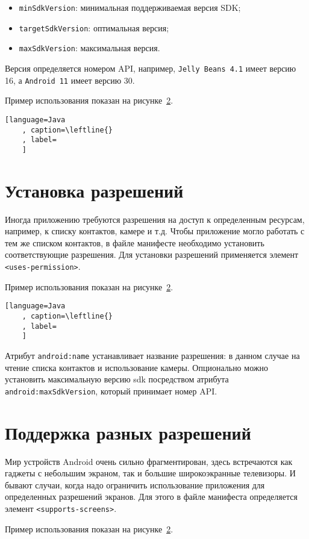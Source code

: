 \begin{itemize}
	\item \texttt{minSdkVersion}: минимальная поддерживаемая версия SDK;
	\item \texttt{targetSdkVersion}: оптимальная версия;
	\item \texttt{maxSdkVersion}: максимальная версия.
\end{itemize}

Версия определяется номером API, например, \texttt{Jelly Beans 4.1}
имеет версию 16, а \texttt{Android 11} имеет версию 30.\par
Пример использования показан на рисунке~\ref{}.

\begin{lstlisting}[language=Java
	, caption=\leftline{}
	, label=
	]
\end{lstlisting}

\section{Установка разрешений}
Иногда приложению требуются разрешения на доступ к определенным
ресурсам, например, к списку контактов, камере и т.д. Чтобы приложение
могло работать с тем же списком контактов, в файле манифесте необходимо
установить соответствующие разрешения. Для установки разрешений
применяется элемент \texttt{<uses-permission>}.\par
Пример использования показан на рисунке~\ref{}.

\begin{lstlisting}[language=Java
	, caption=\leftline{}
	, label=
	]
\end{lstlisting}

Атрибут \texttt{android:name} устанавливает название разрешения: в данном
случае на чтение списка контактов и использование камеры. Опционально можно
установить максимальную версию sdk посредством атрибута
\texttt{android:maxSdkVersion}, который принимает номер API.

\section{Поддержка разных разрешений}
Мир устройств Android очень сильно фрагментирован, здесь встречаются как
гаджеты с небольшим экраном, так и большие широкоэкранные телевизоры.
И бывают случаи, когда надо ограничить использование приложения для
определенных разрешений экранов. Для этого в файле манифеста
определяется элемент \texttt{<supports-screens>}.\par
Пример использования показан на рисунке~\ref{}.

